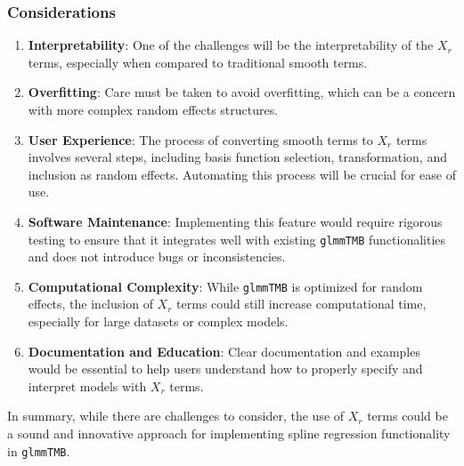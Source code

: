 \subsubsection{Considerations}

\begin{enumerate}
    \item \textbf{Interpretability}: One of the challenges will be the interpretability of the \(X_r\) terms, especially when compared to traditional smooth terms.
    
    \item \textbf{Overfitting}: Care must be taken to avoid overfitting, which can be a concern with more complex random effects structures.
    
    \item \textbf{User Experience}: The process of converting smooth terms to \(X_r\) terms involves several steps, including basis function selection, transformation, and inclusion as random effects. Automating this process will be crucial for ease of use.
    
    \item \textbf{Software Maintenance}: Implementing this feature would require rigorous testing to ensure that it integrates well with existing \texttt{glmmTMB} functionalities and does not introduce bugs or inconsistencies.
    
    \item \textbf{Computational Complexity}: While \texttt{glmmTMB} is optimized for random effects, the inclusion of \(X_r\) terms could still increase computational time, especially for large datasets or complex models.
    
    \item \textbf{Documentation and Education}: Clear documentation and examples would be essential to help users understand how to properly specify and interpret models with \(X_r\) terms.
\end{enumerate}

In summary, while there are challenges to consider, the use of \(X_r\) terms could be a sound and innovative approach for implementing spline regression functionality in \texttt{glmmTMB}.

